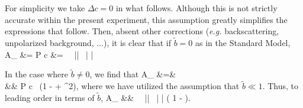 For simplicity we take $\Delta c = 0$ in what follows.  Although this is not strictly accurate within the present experiment, this assumption greatly simplifies the expressions that follow.  Then, absent other corrections (\emph{e.g.} backscattering, unpolarized background, ...), it is clear that if $\tilde{b} = 0$ as in the Standard Model, %
\bea
A_{} &=\;\;  P c &=\;\; \Abeta \,  \, || \, \langle | \cos\theta | \rangle
\eea

In the case where $\tilde{b} \neq 0$, we find that 
\bea
A_{} &=&  \\
&\approx&   P c \, (1 -  + {}^2),
\eea
where we have utilized the assumption that $\tilde{b} \ll 1$.
Thus, to leading order in terms of $\tilde{b}$, 
\bea
A_{} &\approx& \Abeta \,  \, || \, \langle | \cos\theta | \rangle \left( 1 - \bFierz {} \right).
\eea









